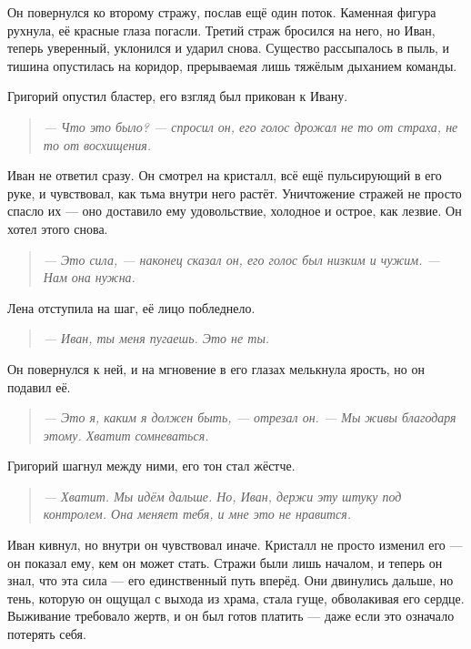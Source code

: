 \documentclass[12pt,a4paper]{book}
\newenvironment{dialogue}{\begin{quote}\itshape}{\end{quote}}
\begin{document}
Он повернулся ко второму стражу, послав ещё один поток. Каменная фигура рухнула, её красные глаза погасли. Третий страж бросился на него, но Иван, теперь уверенный, уклонился и ударил снова. Существо рассыпалось в пыль, и тишина опустилась на коридор, прерываемая лишь тяжёлым дыханием команды.

Григорий опустил бластер, его взгляд был прикован к Ивану.

\begin{dialogue}
--- Что это было? --- спросил он, его голос дрожал не то от страха, не то от восхищения.
\end{dialogue}

Иван не ответил сразу. Он смотрел на кристалл, всё ещё пульсирующий в его руке, и чувствовал, как тьма внутри него растёт. Уничтожение стражей не просто спасло их --- оно доставило ему удовольствие, холодное и острое, как лезвие. Он хотел этого снова.

\begin{dialogue}
--- Это сила, --- наконец сказал он, его голос был низким и чужим. --- Нам она нужна.
\end{dialogue}

Лена отступила на шаг, её лицо побледнело.

\begin{dialogue}
--- Иван, ты меня пугаешь. Это не ты.
\end{dialogue}

Он повернулся к ней, и на мгновение в его глазах мелькнула ярость, но он подавил её.

\begin{dialogue}
--- Это я, каким я должен быть, --- отрезал он. --- Мы живы благодаря этому. Хватит сомневаться.
\end{dialogue}

Григорий шагнул между ними, его тон стал жёстче.

\begin{dialogue}
--- Хватит. Мы идём дальше. Но, Иван, держи эту штуку под контролем. Она меняет тебя, и мне это не нравится.
\end{dialogue}

Иван кивнул, но внутри он чувствовал иначе. Кристалл не просто изменил его --- он показал ему, кем он может стать. Стражи были лишь началом, и теперь он знал, что эта сила --- его единственный путь вперёд. Они двинулись дальше, но тень, которую он ощущал с выхода из храма, стала гуще, обволакивая его сердце. Выживание требовало жертв, и он был готов платить --- даже если это означало потерять себя.
\end{document}
